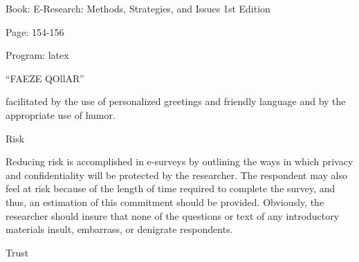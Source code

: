 \documentclass[a4 paper,12pt]{article}
\begin{document}
{\color[rgb]{0.254561,0.025353,0.049655}\begin{center}Book: E-Research: Methods, Strategies, and Issues 1st Edition

Page: 154-156

Program: latex

“FAEZE QOllAR”\end{center}}

facilitated by the use of personalized greetings and friendly language and by the appropriate use of humor.

Risk
 
Reducing risk is accomplished in e-surveys by outlining the ways in which privacy and confidentiality will be protected by the researcher. The respondent may also feel at risk because of the length of time required to complete the survey, and thus, an estimation of this commitment should be provided. Obviously, the researcher should insure that none of the questions or text of any introductory materials insult, embarrass, or denigrate respondents. 

Trust
\end{document}
